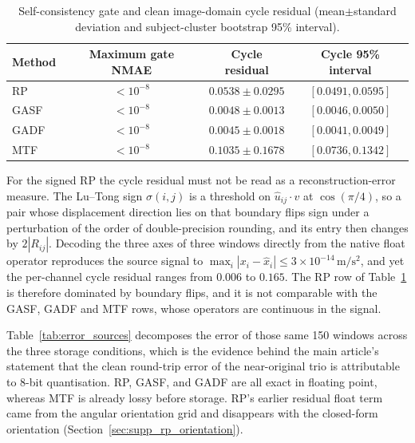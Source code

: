 \documentclass[10pt,a4paper,parskip=half-]{scrartcl}
\begin{document}
\begin{table}[H]
\centering
\caption{Self-consistency gate and clean image-domain cycle residual (mean$\pm$standard deviation and subject-cluster bootstrap 95\% interval).}
\label{tab:supp_cycle_gate}
\begin{tabular}{lccc}
\toprule
Method & Maximum gate NMAE & Cycle residual & Cycle 95\% interval \\
\midrule
RP   & $<10^{-8}$ & $0.0538\pm0.0295$ & $[0.0491,0.0595]$ \\
GASF & $<10^{-8}$ & $0.0048\pm0.0013$ & $[0.0046,0.0050]$ \\
GADF & $<10^{-8}$ & $0.0045\pm0.0018$ & $[0.0041,0.0049]$ \\
MTF  & $<10^{-8}$ & $0.1035\pm0.1678$ & $[0.0736,0.1342]$ \\
\bottomrule
\end{tabular}
\end{table}

For the signed RP the cycle residual must not be read as a reconstruction-error measure. The Lu--Tong sign $\sigma(i,j)$ is a threshold on $\hat u_{ij}\cdot v$ at $\cos(\pi/4)$, so a pair whose displacement direction lies on that boundary flips sign under a perturbation of the order of double-precision rounding, and its entry then changes by $2|R_{ij}|$. Decoding the three axes of three windows directly from the native float operator reproduces the source signal to $\max_i|x_i-\hat x_i|\le3\times10^{-14}\,\mathrm{m/s^2}$, and yet the per-channel cycle residual ranges from $0.006$ to $0.165$. The RP row of Table~\ref{tab:supp_cycle_gate} is therefore dominated by boundary flips, and it is not comparable with the GASF, GADF and MTF rows, whose operators are continuous in the signal.

Table~\ref{tab:error_sources} decomposes the error of those same 150 windows across the three storage conditions, which is the evidence behind the main article's statement that the clean round-trip error of the near-original trio is attributable to 8-bit quantisation. RP, GASF, and GADF are all exact in floating point, whereas MTF is already lossy before storage. RP's earlier residual float term came from the angular orientation grid and disappears with the closed-form orientation (Section~\ref{sec:supp_rp_orientation}).
\end{document}
